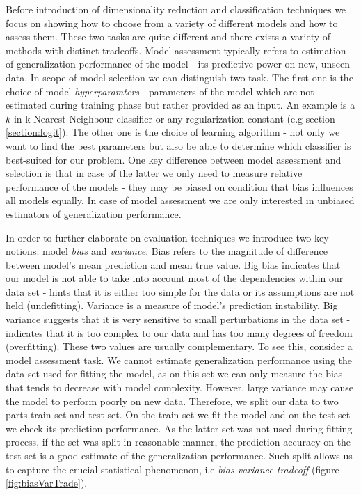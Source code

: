 \documentclass[shortabstract, english, mgr]{iithesis}
\begin{document}
Before introduction of dimensionality reduction and classification techniques we focus on showing how to choose from a variety of different models and how to assess them. These two tasks are quite different and there exists a variety of methods with distinct tradeoffs. Model assessment typically refers to estimation of generalization performance of the model - its predictive power on new, unseen data. In scope of model selection we can distinguish two task. The first one is the choice of model \textit{hyperparamters} - parameters of the model which are not estimated during training phase but rather provided as an input. An example is a $k$ in k-Nearest-Neighbour classifier or any regularization constant (e.g section \ref{section:logit}). The other one is the choice of learning algorithm - not only we want to find the best parameters but also be able to determine which classifier is best-suited for our problem. One key difference between model assessment and selection is that in case of the latter we only need to measure relative performance of the models - they may be biased on condition that bias influences all models equally. In case of model assessment we are only interested in unbiased estimators of generalization performance.

In order to further elaborate on evaluation techniques we introduce two key notions: model \textit{bias} and \textit{variance}. Bias refers to the magnitude of difference between model's mean prediction and mean true value. Big bias indicates that our model is not able to take into account most of the dependencies within our data set - hints that it is either too simple for the data or its assumptions are not held (undefitting). Variance is a measure of model's prediction instability. Big variance suggests that it is very sensitive to small perturbations in the data set - indicates that it is too complex to our data and has too many degrees of freedom (overfitting). These two values are usually complementary. To see this, consider a model assessment task. We cannot estimate generalization performance using the data set used for fitting the model, as on this set we can only measure the bias that tends to decrease with model complexity. However, large variance may cause the model to perform poorly on new data. Therefore, we split our data to two parts train set and test set. On the train set we fit the model and on the test set we check its prediction performance. As the latter set was not used during fitting process, if the set was split in reasonable manner, the prediction accuracy on the test set is a good estimate of the generalization performance. Such split allows us to capture the crucial statistical phenomenon, i.e \textit{bias-variance tradeoff} (figure \ref{fig:biasVarTrade}). 
\end{document}
